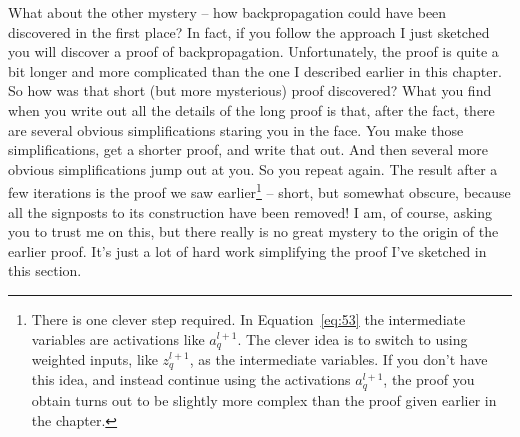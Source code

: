 \documentclass[a4paper,twoside,10pt]{book}
\begin{document}
What about the other mystery -- how backpropagation could have been discovered in the first place? In fact, if you follow the approach I just sketched you will discover a proof of backpropagation. Unfortunately, the proof is quite a bit longer and more complicated than the one I described earlier in this chapter. So how was that short (but more mysterious) proof discovered? What you find when you write out all the details of the long proof is that, after the fact, there are several obvious simplifications staring you in the face. You make those simplifications, get a shorter proof, and write that out. And then several more obvious simplifications jump out at you. So you repeat again. The result after a few iterations is the proof we saw earlier\footnote{There is one clever step required. In Equation~\ref{eq:53} the intermediate variables are activations like $a^{l+1}_q$. The clever idea is to switch to using weighted inputs, like $z^{l+1}_q$, as the intermediate variables. If you don't have this idea, and instead continue using the activations $a^{l+1}_q$, the proof you obtain turns out to be slightly more complex than the proof given earlier in the chapter.} -- short, but somewhat obscure, because all the signposts to its construction have been removed! I am, of course, asking you to trust me on this, but there really is no great mystery to the origin of the earlier proof. It's just a lot of hard work simplifying the proof I've sketched in this section.
\end{document}
